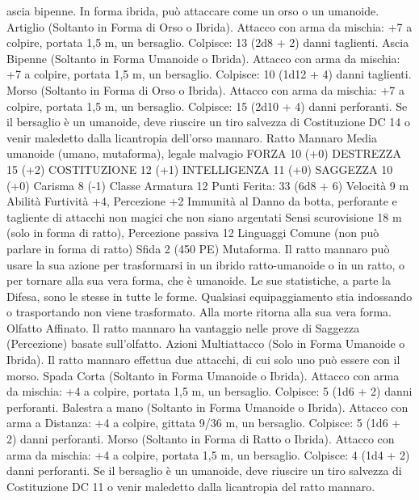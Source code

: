 \begin{multicols}{2}
ascia bipenne. In forma ibrida, può attaccare come un orso o un
umanoide.
Artiglio (Soltanto in Forma di Orso o Ibrida). Attacco con arma
da mischia: +7 a colpire, portata 1,5 m, un bersaglio.
Colpisce: 13 (2d8 + 2) danni taglienti.
Ascia Bipenne (Soltanto in Forma Umanoide o Ibrida). Attacco
con arma da mischia: +7 a colpire, portata 1,5 m, un bersaglio.
Colpisce: 10 (1d12 + 4) danni taglienti.
Morso (Soltanto in Forma di Orso o Ibrida). Attacco con arma
da mischia: +7 a colpire, portata 1,5 m, un bersaglio.
Colpisce: 15 (2d10 + 4) danni perforanti. Se il bersaglio è un
umanoide, deve riuscire un tiro salvezza di Costituzione DC 14 o
venir maledetto dalla licantropia dell’orso mannaro.
Ratto Mannaro
Media umanoide (umano, mutaforma), legale malvagio
FORZA 10 (+0)
DESTREZZA 15 (+2)
COSTITUZIONE 12 (+1)
INTELLIGENZA 11 (+0)
SAGGEZZA 10 (+0)
Carisma 8 (-1)
Classe Armatura 12
\hspace*{0pt}\hfill{Punti Ferita}: 33 (6d8 + 6)
Velocità 9 m
Abilità Furtività +4, Percezione +2
Immunità al Danno da botta, perforante e tagliente di
attacchi non magici che non siano argentati
Sensi scurovisione 18 m (solo in forma di ratto), Percezione
passiva 12
Linguaggi Comune (non può parlare in forma di ratto)
Sfida 2 (450 PE)
Mutaforma. Il ratto mannaro può usare la sua azione per
trasformarsi in un ibrido ratto-umanoide o in un ratto, o per
tornare alla sua vera forma, che è umanoide. Le sue statistiche, a
parte la Difesa, sono le stesse in tutte le forme. Qualsiasi
equipaggiamento stia indossando o trasportando non viene
trasformato. Alla morte ritorna alla sua vera forma.
Olfatto Affinato. Il ratto mannaro ha vantaggio nelle prove di
Saggezza (Percezione) basate sull’olfatto.
Azioni
Multiattacco (Solo in Forma Umanoide o Ibrida). Il ratto
mannaro effettua due attacchi, di cui solo uno può essere con il
morso.
Spada Corta (Soltanto in Forma Umanoide o Ibrida). Attacco
con arma da mischia: +4 a colpire, portata 1,5 m, un bersaglio.
Colpisce: 5 (1d6 + 2) danni perforanti.
Balestra a mano (Soltanto in Forma Umanoide o Ibrida).
Attacco con arma a Distanza: +4 a colpire, gittata 9/36 m, un
bersaglio.
Colpisce: 5 (1d6 + 2) danni perforanti.
Morso (Soltanto in Forma di Ratto o Ibrida). Attacco con arma
da mischia: +4 a colpire, portata 1,5 m, un bersaglio.
Colpisce: 4 (1d4 + 2) danni perforanti. Se il bersaglio è un
umanoide, deve riuscire un tiro salvezza di Costituzione DC 11 o
venir maledetto dalla licantropia del ratto mannaro.
 

\end{multicols}
